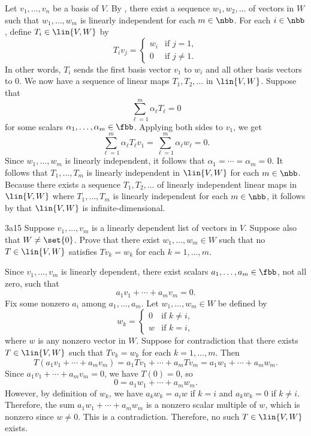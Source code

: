 \begin{sol}
    Let $v_1, \ldots, v_n$ be a basis of $V$.
	By , there exist a sequence $w_1, w_2, \ldots$ of vectors in $W$ such that $w_1, \ldots, w_m$ is linearly independent for each $m \in \nbb$.
    For each $i \in \nbb$, define $T_i \in \lin{V, W}$ by
    \[
        T_i v_j =
        \begin{cases}
            w_i & \text{if } j = 1, \\
            0 & \text{if } j \neq 1.
        \end{cases}
    \]
    In other words, $T_i$ sends the first basis vector $v_1$ to $w_i$ and all other basis vectors to $0$.
    We now have a sequence of linear maps $T_1, T_2, \ldots$ in $\lin{V, W}$.
    Suppose that
    \[
        \sum_{\ell=1}^{m} \alpha_\ell T_\ell = 0
    \]
    for some scalars $\alpha_1, \ldots, \alpha_m \in \fbb$. 
    Applying both sides to $v_1$, we get
    \[
        \sum_{\ell=1}^{m} \alpha_\ell T_\ell v_1 = \sum_{\ell=1}^{m} \alpha_\ell w_\ell = 0.
    \]
    Since $w_1, \ldots, w_m$ is linearly independent, it follows that $\alpha_1 = \cdots = \alpha_m = 0$.
    It follows that $T_1, \ldots, T_m$ is linearly independent in $\lin{V, W}$ for each $m \in \nbb$.
    Because there exists a sequence $T_1, T_2, \ldots$ of linearly independent linear maps in $\lin{V, W}$ where $T_1, \ldots, T_m$ is linearly independent for each $m \in \nbb$, it follows by  that $\lin{V, W}$ is infinite-dimensional.
\end{sol}

\begin{exercise}{3a15}
    Suppose $v_1, \ldots, v_m$ is a linearly dependent list of vectors in $V$.
	Suppose also that $W \neq \set{0}$.
	Prove that there exist $w_1, \ldots, w_m \in W$ such that no $T \in \lin{V, W}$ satisfies $Tv_k = w_k$ for each $k = 1, \ldots, m$.
\end{exercise}

\begin{sol}
    Since $v_1, \ldots, v_m$ is linearly dependent, there exist scalars $a_1, \ldots, a_m \in \fbb$, not all zero, such that
    \[
    	a_1 v_1 + \cdots + a_m v_m = 0.
    \]
    Fix some nonzero $a_i$ among $a_1, \ldots, a_m$.
	Let $w_1, \ldots, w_m \in W$ be defined by
    \[
        w_k =
        \begin{cases}
            0 & \text{if } k \neq i, \\
            w & \text{if } k = i,
        \end{cases}
    \]
    where $w$ is any nonzero vector in $W$.
	Suppose for contradiction that there exists $T \in \lin{V, W}$ such that $Tv_k = w_k$ for each $k = 1, \ldots, m$.
	Then
    \[
    	T(a_1 v_1 + \cdots + a_m v_m) = a_1 Tv_1 + \cdots + a_m Tv_m = a_1 w_1 + \cdots + a_m w_m.
    \]
    Since $a_1 v_1 + \cdots + a_m v_m = 0$, we have $T(0) = 0$, so
    \[
    	0 = a_1 w_1 + \cdots + a_m w_m.
    \]
    However, by definition of $w_k$, we have $a_kw_k = a_i w$ if $k = i$ and $a_kw_k = 0$ if $k \neq i$.
	Therefore, the sum $a_1 w_1 + \cdots + a_m w_m$ is a nonzero scalar multiple of $w$, which is nonzero since $w \neq 0$.
	This is a contradiction.
	Therefore, no such $T \in \lin{V, W}$ exists.
\end{sol}

